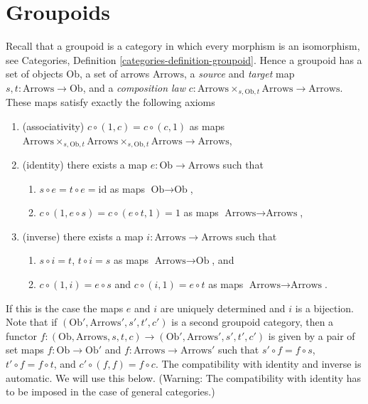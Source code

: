 \section{Groupoids}
\label{section-groupoids}

\noindent
Recall that a groupoid is a category in which every morphism
is an isomorphism, see
Categories, Definition \ref{categories-definition-groupoid}.
Hence a groupoid has a set of objects $\text{Ob}$,
a set of arrows $\text{Arrows}$, a {\it source} and {\it target}
map $s, t : \text{Arrows} \to \text{Ob}$, and a {\it composition law}
$c : \text{Arrows} \times_{s, \text{Ob}, t} \text{Arrows}
\to \text{Arrows}$.
These maps satisfy exactly the following axioms
\begin{enumerate}
\item (associativity) $c \circ (1, c) = c \circ (c, 1)$ as maps
$\text{Arrows} \times_{s, \text{Ob}, t}
\text{Arrows} \times_{s, \text{Ob}, t}
\text{Arrows} \to \text{Arrows}$,
\item (identity) there exists a map $e : \text{Ob} \to \text{Arrows}$
such that
\begin{enumerate}
\item $s \circ e = t \circ e = \text{id}$ as maps $\text{Ob} \to \text{Ob}$,
\item $c \circ (1, e \circ s) = c \circ (e \circ t, 1) = 1$
as maps $\text{Arrows} \to \text{Arrows}$,
\end{enumerate}
\item (inverse) there exists a map $i : \text{Arrows} \to \text{Arrows}$
such that
\begin{enumerate}
\item $s \circ i = t$, $t \circ i = s$ as maps $\text{Arrows} \to \text{Ob}$,
and
\item $c \circ (1, i) = e \circ s$ and $c \circ (i, 1) = e \circ t$
as maps $\text{Arrows} \to \text{Arrows}$.
\end{enumerate}
\end{enumerate}
If this is the case the maps $e$ and $i$ are uniquely determined and
$i$ is a bijection. Note that if $(\text{Ob}', \text{Arrows}', s', t', c')$
is a second groupoid category, then a functor
$f : (\text{Ob}, \text{Arrows}, s, t, c) \to
(\text{Ob}', \text{Arrows}', s', t', c')$
is given by a pair of set maps $f : \text{Ob} \to \text{Ob}'$ and
$f : \text{Arrows} \to \text{Arrows}'$ such that
$s' \circ f = f \circ s$, $t' \circ f = f \circ t$, and
$c' \circ (f, f) = f \circ c$. The compatibility with identity and
inverse is automatic. We will use this below.
(Warning: The compatibility with identity
has to be imposed in the case of general categories.)

